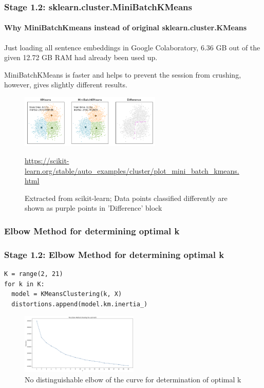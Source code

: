 \documentclass{tum-presentation}
\begin{document}
\begin{frame}[fragile]
  \frametitle{Stage 1.2: sklearn.cluster.MiniBatchKMeans}
  \framesubtitle{Why MiniBatchKmeans instead of original sklearn.cluster.KMeans}
  \begin{description}
    Just loading all sentence embeddings in Google Colaboratory, 6.36 GB out of the given 12.72 GB RAM had already been used up. 
  \end{description}
  \begin{description}
    MiniBatchKMeans is faster and helps to prevent the session from crushing, however, gives slightly different results.
  \end{description}
  \begin{figure}[t]
    \includegraphics[width=0.60\textwidth]{images/sphx_glr_plot_mini_batch_kmeans_001.png}
    \caption{Extracted from scikit-learn; Data points classified differently are shown as purple points in 'Difference' block}
    \url{https://scikit-learn.org/stable/auto_examples/cluster/plot_mini_batch_kmeans.html}
  \end{figure}
\end{frame}
\subsubsection{Elbow Method for determining optimal k}
\begin{frame}[fragile]
  \frametitle{Stage 1.2: Elbow Method for determining optimal k}
  \begin{lstlisting}
K = range(2, 21)
for k in K:
  model = KMeansClustering(k, X)
  distortions.append(model.km.inertia_)
  \end{lstlisting}
  \begin{center}
    \begin{figure}[t]
      \includegraphics[width=0.5\textwidth]{images/elbow-1to20ks.png}
      \caption{No distinguishable elbow of the curve for determination of optimal k}
    \end{figure}
  \end{center}
\end{frame}
\end{document}
